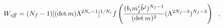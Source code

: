 \begin{equation}
  W_{\it eff} = (N_f-1) [(\det m)\Lambda^{2N_c-1}]^{1/N_c}
  f\left(\frac{(b_i m^i_{j} \tilde{b}^{{j}})^{N_f-1}}
  {(\det m)^2} (\Lambda^{2N_f-3})^{N_f-3}\right)~~,
\label{p1}
\end{equation}

